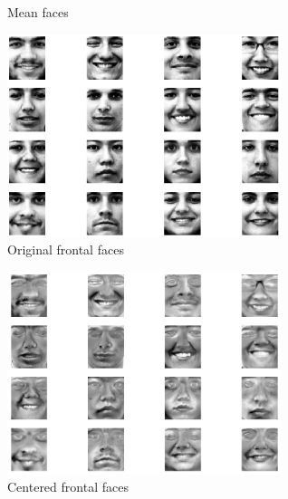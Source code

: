 \documentclass[11pt]{article}
\begin{document}
\begin{figure}[H]
\centering
{}
\caption{Mean faces}
\label{Fig1.lable}
\end{figure}

\begin{figure}[H]
\centering
\includegraphics[width=80mm]{originalFace.png}
\caption{Original frontal faces}
\label{Fig2.lable}
\end{figure}

\begin{figure}[H]
\centering
\includegraphics[width=80mm]{trainFace.png}
\caption{Centered frontal faces}
\label{Fig2.lable}
\end{figure}
\end{document}
